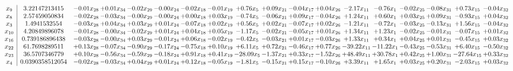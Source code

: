 \documentclass[9pt]{article}
\begin{document}
 \[\begin{array}{c| c c@{\hskip 2pt} c@{\hskip 2pt} c@{\hskip 2pt} c@{\hskip 2pt} c@{\hskip 2pt} c@{\hskip 2pt} c@{\hskip 2pt} c@{\hskip 2pt} c@{\hskip 2pt} c@{\hskip 2pt} c@{\hskip 2pt} c@{\hskip 2pt} c@{\hskip 2pt} c@{\hskip 2pt} c@{\hskip 2pt} c@{\hskip 2pt} }
 x_{9}   &  3.22147213415 & -0.01 x_{28} & +  0.01 x_{34} & -0.02 x_{29} & -0.00 x_{24} & -0.02 x_{18} & -0.01 x_{19} & +  0.76 x_{5} & +  0.09 x_{21} & -0.04 x_{17} & +  0.04 x_{26} & -2.17 x_{11} & -0.76 x_{1} & -0.02 x_{25} & -0.08 x_{31} & +  0.73 x_{15} & -0.04 x_{32}\\
 x_{8}   &  2.57459050834 & -0.02 x_{28} & -0.03 x_{34} & -0.00 x_{29} & -0.00 x_{24} & +  0.00 x_{18} & +  0.03 x_{19} & -0.74 x_{5} & -0.06 x_{21} & +  0.09 x_{17} & -0.04 x_{26} & +  1.24 x_{11} & +  0.60 x_{1} & +  0.03 x_{25} & +  0.09 x_{31} & -0.93 x_{15} & +  0.04 x_{32}\\
 x_{3}   &  1.4941532554 & -0.03 x_{28} & +  0.04 x_{34} & +  0.03 x_{29} & +  0.01 x_{24} & -0.07 x_{18} & +  0.02 x_{19} & +  0.56 x_{5} & +  0.02 x_{21} & -0.07 x_{17} & +  0.02 x_{26} & -1.21 x_{11} & -0.72 x_{1} & -0.03 x_{25} & -0.13 x_{31} & +  1.56 x_{15} & -0.04 x_{32}\\
 x_{10}   &  4.20849896078 & -0.01 x_{28} & -0.00 x_{34} & -0.02 x_{29} & +  0.01 x_{24} & +  0.04 x_{18} & +  0.05 x_{19} & -1.17 x_{5} & -0.02 x_{21} & -0.05 x_{17} & +  0.01 x_{26} & +  1.34 x_{11} & +  1.23 x_{1} & -0.02 x_{25} & -0.01 x_{31} & -0.07 x_{15} & +  0.01 x_{32}\\
 x_{16}   &  0.739186896438 & -0.03 x_{28} & -0.00 x_{34} & +  0.03 x_{29} & -0.01 x_{24} & +  0.06 x_{18} & -0.02 x_{19} & -0.42 x_{5} & -0.03 x_{21} & +  0.01 x_{17} & -0.03 x_{26} & +  1.33 x_{11} & +  0.34 x_{1} & +  0.04 x_{25} & +  0.01 x_{31} & -0.45 x_{15} & +  0.03 x_{32}\\
 x_{22}   &  61.7698289511 & +  0.13 x_{28} & -0.07 x_{34} & -0.90 x_{29} & -0.17 x_{24} & -0.75 x_{18} & +  0.10 x_{19} & +  6.11 x_{5} & +  0.72 x_{21} & -0.46 x_{17} & +  0.77 x_{26} & -39.22 x_{11} & -11.22 x_{1} & -0.43 x_{25} & -0.53 x_{31} & +  6.40 x_{15} & -0.50 x_{32}\\
 x_{23}   &  36.5707346779 & +  0.10 x_{28} & -0.56 x_{34} & -0.59 x_{29} & -0.18 x_{24} & +  0.91 x_{18} & +  0.41 x_{19} & -28.09 x_{5} & -1.37 x_{21} & +  0.33 x_{17} & -1.52 x_{26} & + 48.49 x_{11} & + 30.78 x_{1} & +  0.42 x_{25} & +  1.00 x_{31} & -27.64 x_{15} & +  0.33 x_{32}\\
 x_{4}   &  0.0390358512054 & -0.02 x_{28} & -0.03 x_{34} & +  0.04 x_{29} & +  0.01 x_{24} & +  0.12 x_{18} & -0.05 x_{19} & -1.81 x_{5} & -0.15 x_{21} & +  0.15 x_{17} & -0.10 x_{26} & +  3.39 x_{11} & +  1.65 x_{1} & +  0.03 x_{25} & +  0.20 x_{31} & -2.03 x_{15} & +  0.03 x_{32}\\

\end{array}\]
\end{document}
